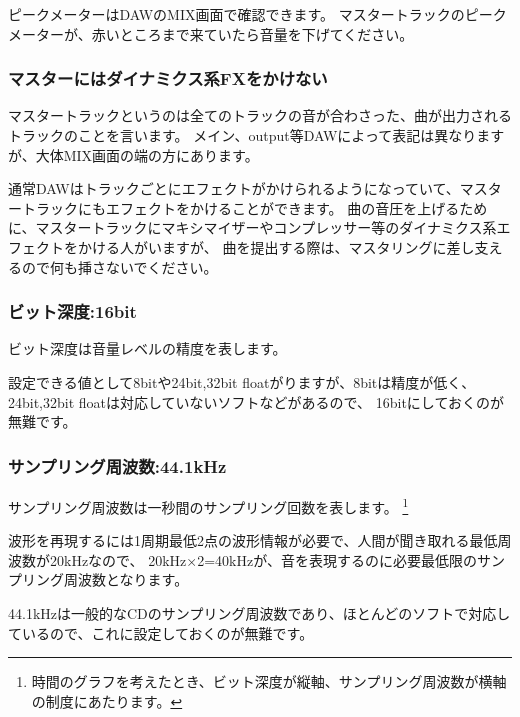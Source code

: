 \documentclass[11pt,a4paper]{jsarticle}
\begin{document}
                ピークメーターはDAWのMIX画面で確認できます。
                マスタートラックのピークメーターが、赤いところまで来ていたら音量を下げてください。

            \subsubsection{マスターにはダイナミクス系FXをかけない}
                マスタートラックというのは全てのトラックの音が合わさった、曲が出力されるトラックのことを言います。
                メイン、output等DAWによって表記は異なりますが、大体MIX画面の端の方にあります。

                通常DAWはトラックごとにエフェクトがかけられるようになっていて、マスタートラックにもエフェクトをかけることができます。
                曲の音圧を上げるために、マスタートラックにマキシマイザーやコンプレッサー等のダイナミクス系エフェクトをかける人がいますが、
                曲を提出する際は、マスタリングに差し支えるので何も挿さないでください。

            \subsubsection{ビット深度:16bit}
                ビット深度は音量レベルの精度を表します。
                
                設定できる値として8bitや24bit,32bit floatがりますが、8bitは精度が低く、24bit,32bit floatは対応していないソフトなどがあるので、
                16bitにしておくのが無難です。

            \subsubsection{サンプリング周波数:44.1kHz}
                サンプリング周波数は一秒間のサンプリング回数を表します。
                \footnote{時間のグラフを考えたとき、ビット深度が縦軸、サンプリング周波数が横軸の制度にあたります。}
                
                波形を再現するには1周期最低2点の波形情報が必要で、人間が聞き取れる最低周波数が20kHzなので、
                20kHz×2=40kHzが、音を表現するのに必要最低限のサンプリング周波数となります。
                
                44.1kHzは一般的なCDのサンプリング周波数であり、ほとんどのソフトで対応しているので、これに設定しておくのが無難です。
            
            

%
%
\end{document}
